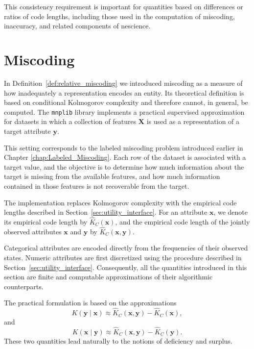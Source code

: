 This consistency requirement is important for quantities based on differences or ratios of code lengths, including those used in the computation of miscoding, inaccuracy, and related components of nescience.

%
%

\section{Miscoding}
\label{sec:machine_learning_miscoding}

In Definition~\ref{def:relative_miscoding} we introduced miscoding as a measure of how inadequately a representation encodes an entity. Its theoretical definition is based on conditional Kolmogorov complexity and therefore cannot, in general, be computed. The \texttt{mnplib} library implements a practical supervised approximation for datasets in which a collection of features $\mathbf{X}$ is used as a representation of a target attribute $\mathbf{y}$.

This setting corresponds to the labeled miscoding problem introduced earlier in Chapter \ref{chap:Labeled_Miscoding}. Each row of the dataset is associated with a target value, and the objective is to determine how much information about the target is missing from the available features, and how much information contained in those features is not recoverable from the target.

The implementation replaces Kolmogorov complexity with the empirical code lengths described in Section~\ref{sec:utility_interface}. For an attribute $\mathbf{x}$, we denote its empirical code length by $\hat K_C(\mathbf{x})$, and the empirical code length of the jointly observed attributes $\mathbf{x}$ and $\mathbf{y}$ by $\hat K_C(\mathbf{x},\mathbf{y})$.

Categorical attributes are encoded directly from the frequencies of their observed states. Numeric attributes are first discretized using the procedure described in Section~\ref{sec:utility_interface}. Consequently, all the quantities introduced in this section are finite and computable approximations of their algorithmic counterparts.

The practical formulation is based on the approximations
\[
K(\mathbf{y}\mid\mathbf{x}) \approx \hat K_C(\mathbf{x},\mathbf{y}) - \hat K_C(\mathbf{x}),
\]
and
\[
K(\mathbf{x}\mid\mathbf{y}) \approx \hat K_C(\mathbf{x},\mathbf{y}) - \hat K_C(\mathbf{y}).
\]
These two quantities lead naturally to the notions of deficiency and surplus.


